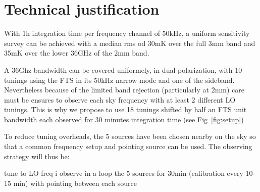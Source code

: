 \section{Technical justification}
With 1h integration time per frequency channel of 50kHz, a uniform sensitivity survey can be achieved with a median rms od 30mK over the full 3mm band and 35mK over the lower 36GHz of the 2mm band. 

A 36Ghz bandwidth can be covered uniformely, in dual polarization, with 10 tunings using the FTS in its 50kHz narrow mode and one of the sideband. Nevertheless because of the limited band rejection (particularly at 2mm) care must be ensures to observe each sky frequency with at least 2 different LO tunings. This is why we propose to use 18 tunings shifted by half an FTS unit bandwidth each observed for 30 minutes integration time (see Fig~\ref{fig:setup})

To reduce tuning overheads, the 5 sources have been chosen nearby on the sky so that a common frequency setup and pointing source can be used. The observing strategy will thus be: 

tune to LO freq i
observe in a loop the 5 sources for 30min (calibration every 10-15 min) with pointing between each source 

   
  
  
  
  
  
  